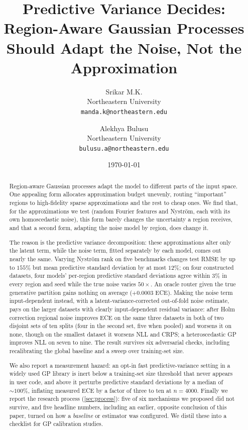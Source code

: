 \documentclass[11pt]{article}
\title{Predictive Variance Decides:\\
Region-Aware Gaussian Processes Should Adapt the Noise, Not the Approximation}
\author{
  Srikar M.K.\\ Northeastern University\\ \texttt{manda.k@northeastern.edu}
  \and
  Alekhya Bulusu\\ Northeastern University\\ \texttt{bulusu.a@northeastern.edu}
}
\date{\today}
\begin{document}
\maketitle

\begin{abstract}
Region-aware Gaussian processes adapt the model to different parts of the input
space. One appealing form allocates approximation budget unevenly, routing
``important'' regions to high-fidelity sparse approximations and the rest to cheap
ones. We find that, for the approximations we test (random Fourier features and
Nystr\"om, each with its own homoscedastic noise), this form barely changes the
uncertainty a region receives, and that a second form, adapting the noise model by
region, does change it.

The reason is the predictive variance decomposition: these approximations alter only
the latent term, while the noise term, fitted separately by each model, comes out
nearly the same. Varying Nystr\"om rank on five benchmarks changes test RMSE by up to
$155\%$ but mean predictive standard deviation by at most $12\%$; on four constructed
datasets, four models' per-region predictive standard deviations agree within $3\%$ in
every region and seed while the true noise varies $50\times$. An oracle router given
the true generative partition gains nothing on average ($+0.0003$ ECE). Making the noise
term input-dependent instead, with a latent-variance-corrected out-of-fold noise
estimate, pays on the larger datasets with clearly input-dependent residual variance:
after Holm correction regional noise improves ECE on the same three datasets in both
of two disjoint sets of ten splits (four in the second set, five when pooled) and
worsens it on none, though on the
smallest dataset it worsens NLL and CRPS; a heteroscedastic GP improves NLL on seven
to nine. The result survives six adversarial checks, including recalibrating the
global baseline and a sweep over training-set size.

We also report a measurement hazard: an opt-in fast predictive-variance setting in a
widely used GP library is inert below a training-set size threshold that never
appears in user code, and above it perturbs predictive standard deviations by a
median of ${\sim}100\%$, inflating measured ECE by a factor of three to ten at
$n=4000$. Finally we report the research process (\cref{sec:process}): five of six
mechanisms we proposed did not survive, and five headline numbers, including an
earlier, opposite conclusion of this paper, turned on how a \emph{baseline} or
estimator was configured. We distil these into a checklist for GP calibration studies.
\end{abstract}
\end{document}
